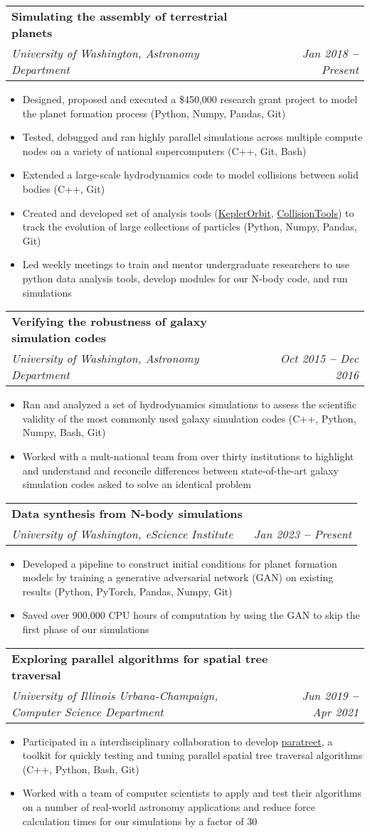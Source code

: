 \documentclass[letterpaper,11pt]{article}
\makeatletter
\newcommand{\resumeItem}[1]{
  \item\small{
    {#1 \vspace{-2pt}}
  }
}
\newcommand{\resumeSubheading}[4]{
  \vspace{-2pt}\item
    \begin{tabular*}{0.97\textwidth}[t]{l@{\extracolsep{\fill}}r}
      \textbf{#1} & #2 \\
      \textit{\small#3} & \textit{\small #4} \\
    \end{tabular*}\vspace{-7pt}
}
\newcommand{\resumeItemListStart}{\begin{itemize}}
\newcommand{\resumeItemListEnd}{\end{itemize}\vspace{-5pt}}
\makeatother
\begin{document}
    \resumeSubheading
      {Simulating the assembly of terrestrial planets}{}
      {University of Washington, Astronomy Department}{Jan 2018 \textbf{--} Present}
        \resumeItemListStart
        	    \resumeItem{Designed, proposed and executed a \$450,000 research grant project to model the planet formation process (Python, Numpy, Pandas, Git)}
            \resumeItem{Tested, debugged and ran highly parallel simulations across multiple compute nodes on a variety of national supercomputers (C++, Git, Bash)}
            \resumeItem{Extended a large-scale hydrodynamics code to model collisions between solid bodies (C++, Git)}
            \resumeItem{Created and developed set of analysis tools ({\sc \href{https://github.com/spencerw/CollisionTools}{KeplerOrbit}}, {\sc \href{https://github.com/spencerw/KeplerOrbit}{CollisionTools}}) to track the evolution of large collections of particles (Python, Numpy, Pandas, Git)}
            \resumeItem{Led weekly meetings to train and mentor undergraduate researchers to use python data analysis tools, develop modules for our N-body code, and run simulations}
        \resumeItemListEnd
    
 \resumeSubheading
      {Verifying the robustness of galaxy simulation codes}{}
      {University of Washington, Astronomy Department}{Oct 2015 \textbf{--} Dec 2016}
        \resumeItemListStart
            \resumeItem{Ran and analyzed a set of hydrodynamics simulations to assess the scientific validity of the most commonly used galaxy simulation codes (C++, Python, Numpy, Bash, Git)}
            \resumeItem{Worked with a mult-national team from over thirty institutions to highlight and understand and reconcile differences between state-of-the-art galaxy simulation codes asked to solve an identical problem}
        \resumeItemListEnd
        
      \resumeSubheading
      {Data synthesis from N-body simulations}{}
      {University of Washington, eScience Institute}{Jan 2023 \textbf{--} Present}
        \resumeItemListStart
        	   \resumeItem{Developed a pipeline to construct initial conditions for planet formation models by training a generative adversarial network (GAN) on existing results (Python, PyTorch, Pandas, Numpy, Git)}
            \resumeItem{Saved over 900,000 CPU hours of computation by using the GAN to skip the first phase of our simulations}
        \resumeItemListEnd
        
        \resumeSubheading
      {Exploring parallel algorithms for spatial tree traversal}{}
      {University of Illinois Urbana-Champaign, Computer Science Department}{Jun 2019 \textbf{--} Apr 2021}
        \resumeItemListStart
            \resumeItem{Participated in a interdisciplinary collaboration to develop {\sc \href{https://paratreet.github.io/}{paratreet}}, a toolkit for quickly testing and tuning parallel spatial tree traversal algorithms (C++, Python, Bash, Git)}
            \resumeItem{Worked with a team of computer scientists to apply and test their algorithms on a number of real-world astronomy applications and reduce force calculation times for our simulations by a factor of 30}
        \resumeItemListEnd
    
\end{document}
